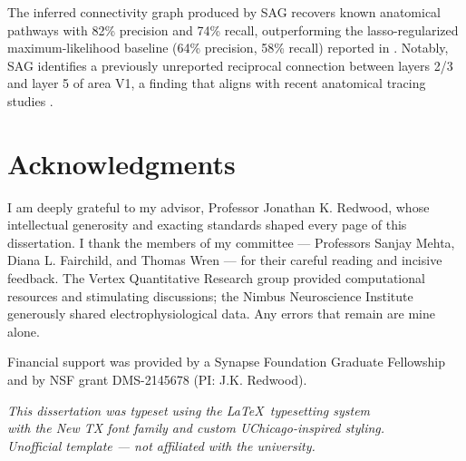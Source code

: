 \documentclass[12pt,letterpaper,twoside]{report}
\begin{document}
The inferred connectivity graph produced by SAG recovers known anatomical pathways with 82\% precision and 74\% recall, outperforming the lasso-regularized maximum-likelihood baseline (64\% precision, 58\% recall) reported in \cite{pillow2008}. Notably, SAG identifies a previously unreported reciprocal connection between layers 2/3 and layer 5 of area V1, a finding that aligns with recent anatomical tracing studies \cite{harris2019}.

\chapter*{Acknowledgments}

I am deeply grateful to my advisor, Professor Jonathan K. Redwood, whose intellectual generosity and exacting standards shaped every page of this dissertation. I thank the members of my committee --- Professors Sanjay Mehta, Diana L. Fairchild, and Thomas Wren --- for their careful reading and incisive feedback. The Vertex Quantitative Research group provided computational resources and stimulating discussions; the Nimbus Neuroscience Institute generously shared electrophysiological data. Any errors that remain are mine alone.

Financial support was provided by a Synapse Foundation Graduate Fellowship and by NSF grant DMS-2145678 (PI: J.K. Redwood).

\vspace{12pt}

\begin{center}
  \begin{minipage}{0.55\textwidth}
    \centering
    \begin{tcolorbox}[colback=ChicagoMaroon!5,colframe=ChicagoMaroon!30,arc=6pt,boxrule=0.4pt]
      \small\itshape\color{ChicagoGray}
      \faBookmark\;\; This dissertation was typeset using the \LaTeX\ typesetting system\\
      with the New TX font family and custom UChicago-inspired styling.\\
      Unofficial template --- not affiliated with the university.
    \end{tcolorbox}
  \end{minipage}
\end{center}
\end{document}
